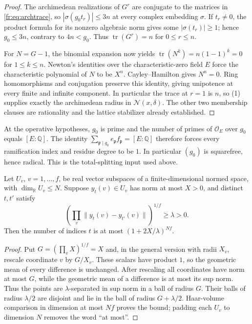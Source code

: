 \begin{proof}
The archimedean realizations of $G^r$ are conjugate to the matrices in \eqref{fr:eq:archtrace}, so $|\sigma(g_0t_r)|\le3n$ at every complex embedding $\sigma$. If $t_r\ne0$, the product formula for its nonzero algebraic norm gives some $|\sigma(t_r)|\ge1$; hence $g_0\le3n$, contrary to $4n<g_0$. Thus $\operatorname{tr}(G^r)=n$ for $0\le r\le n$.

For $N=G-1$, the binomial expansion now yields $\operatorname{tr}(N^k)=n(1-1)^k=0$ for $1\le k\le n$. Newton's identities over the characteristic-zero field $E$ force the characteristic polynomial of $N$ to be $X^n$. Cayley--Hamilton gives $N^n=0$. Ring homomorphisms and conjugation preserve this identity, giving unipotence at every finite and infinite component. In particular the trace at $r=1$ is $n$, so (1) supplies exactly the archimedean radius in $\mathcal N(x,\delta)$. The other two membership clauses are rationality and the lattice stabilizer already established.
\end{proof}

At the operative hypotheses, $g_0$ is prime and the number of primes of $\mathcal O_E$ over $g_0$ equals $[E:\mathbb Q]$. The identity $\sum_{\mathfrak p\mid g_0}e_{\mathfrak p}f_{\mathfrak p}=[E:\mathbb Q]$ therefore forces every ramification index and residue degree to be $1$. In particular $(g_0)$ is squarefree, hence radical. This is the total-splitting input used above.

\begin{lemma}\label{fr:lem:gm-packing}
Let $U_v$, $v=1,\dots,f$, be real vector subspaces of a finite-dimensional normed space, with $\dim_{\mathbb R}U_v\le N$. Suppose $y_t(v)\in U_v$ has norm at most $X>0$, and distinct $t,t'$ satisfy
\[
 \left(\prod_v\|y_t(v)-y_{t'}(v)\|\right)^{1/f}\ge\lambda>0.
\]
Then the number of indices $t$ is at most $(1+2X/\lambda)^{Nf}$.
\end{lemma}

\begin{proof}
Put $G=(\prod_vX)^{1/f}=X$ and, in the general version with radii $X_v$, rescale coordinate $v$ by $G/X_v$. These scalars have product $1$, so the geometric mean of every difference is unchanged. After rescaling all coordinates have norm at most $G$, while the geometric mean of a difference is at most its sup norm. Thus the points are $\lambda$-separated in sup norm in a ball of radius $G$. Their balls of radius $\lambda/2$ are disjoint and lie in the ball of radius $G+\lambda/2$. Haar-volume comparison in dimension at most $Nf$ proves the bound; padding each $U_v$ to dimension $N$ removes the word ``at most''.
\end{proof}

